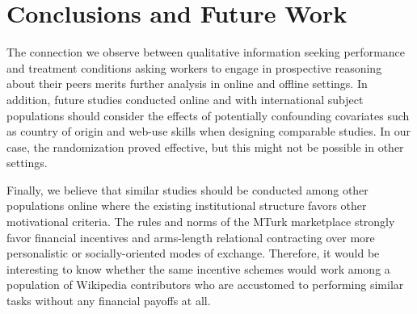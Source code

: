 \documentclass{chi2009}
\begin{document}
\section{Conclusions and Future Work}

The connection we observe between qualitative information seeking performance and treatment conditions asking workers to engage in prospective reasoning about their peers merits further analysis in online and offline settings. In addition, future studies conducted online and with international subject populations should consider the effects of potentially confounding covariates such as country of origin and web-use skills when designing comparable studies. In our case, the randomization proved effective, but this might not be possible in other settings.

Finally, we believe that similar studies should be conducted among other populations online where the existing institutional structure favors other motivational criteria. The rules and norms of the MTurk marketplace strongly favor financial incentives and arms-length relational contracting over more personalistic or socially-oriented modes of exchange. Therefore, it would be interesting to know whether the same incentive schemes would work among a population of Wikipedia contributors who are accustomed to performing similar tasks without any financial payoffs at all.


%
%
%
%
%


\end{document}
